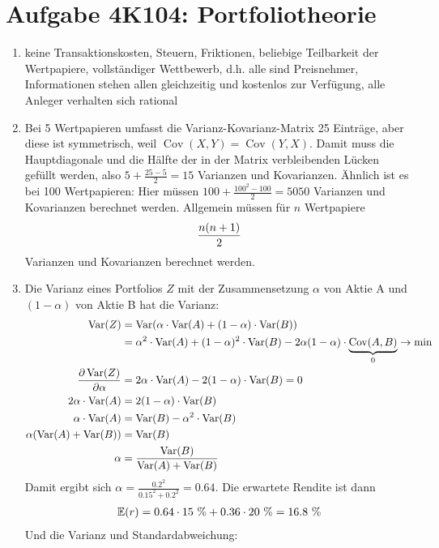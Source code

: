 \documentclass{article}
\newcommand{\E}{\mathbb{E}}
\DeclareMathOperator{\Var}{Var}
\DeclareMathOperator{\Cov}{Cov}
\begin{document}
	\section*{Aufgabe 4K104: Portfoliotheorie}
	\begin{enumerate}[label=(\alph*)]
		\item keine Transaktionskosten, Steuern, Friktionen, beliebige Teilbarkeit der Wertpapiere, vollständiger Wettbewerb, d.h. alle sind Preisnehmer, Informationen stehen allen gleichzeitig und kostenlos zur Verfügung, alle Anleger verhalten sich rational
		\item Bei 5 Wertpapieren umfasst die Varianz-Kovarianz-Matrix 25 Einträge, aber diese ist symmetrisch, weil $\Cov(X,Y)=\Cov(Y,X)$. Damit muss die Hauptdiagonale und die Hälfte der in der Matrix verbleibenden Lücken gefüllt werden, also $5+\frac{25-5}{2}=15$ Varianzen und Kovarianzen. Ähnlich ist es bei 100 Wertpapieren: Hier müssen $100+\frac{100^2-100}{2}=5050$ Varianzen und Kovarianzen berechnet werden. Allgemein müssen für $n$ Wertpapiere
		\begin{align}
			\frac{n(n+1)}{2} \notag
		\end{align}
		Varianzen und Kovarianzen berechnet werden.
		\item Die Varianz eines Portfolios $Z$ mit der Zusammensetzung $\alpha$ von Aktie A und $(1-\alpha)$ von Aktie B hat die Varianz:
		\begin{align}
			\Var(Z) &= \Var(\alpha\cdot\Var(A) + (1-\alpha)\cdot\Var(B)) \notag \\
			&= \alpha^2\cdot\Var(A) + (1-\alpha)^2\cdot\Var(B) - 2\alpha(1-\alpha)\cdot\underbrace{\Cov(A,B)}_{0} \to\min \notag \\
			\frac{\partial \Var(Z)}{\partial\alpha} &= 2\alpha\cdot\Var(A) - 2(1-\alpha)\cdot\Var(B) = 0 \notag \\
			2\alpha\cdot\Var(A) &= 2(1-\alpha)\cdot\Var(B) \notag \\
			\alpha\cdot\Var(A) &= \Var(B) - \alpha^2\cdot\Var(B) \notag \\
			\alpha(\Var(A) + \Var(B)) &= \Var(B) \notag \\
			\alpha &= \frac{\Var(B)}{\Var(A) + \Var(B)} \notag
		\end{align}
		Damit ergibt sich $\alpha=\frac{0.2^2}{0.15^2+0.2^2}=0.64$. Die erwartete Rendite ist dann
		\begin{align}
			\E(r) = 0.64\cdot 15\text{ \%} + 0.36\cdot 20\text{ \%} = 16.8\text{ \%} \notag
		\end{align}
		Und die Varianz und Standardabweichung:

\end{enumerate}
\end{document}
